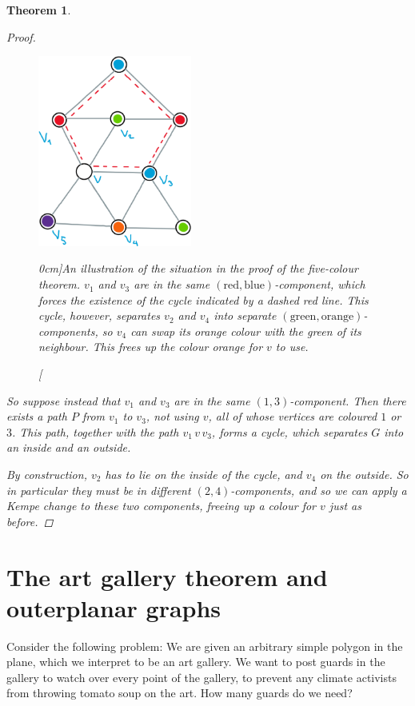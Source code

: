 \documentclass[nobib]{tufte-handout}
\newtheorem{theorem}{Theorem}
\begin{document}
\begin{theorem}
\begin{proof}
    \begin{figure}
      \centering
      \includegraphics[width=0.45\textwidth]{graphics/L12_colouring/planar_five_colour.png}
      \caption[][0cm]{An illustration of the situation in the proof of the five-colour theorem. $v_1$ and $v_3$ are in the same $(\text{red},\text{blue})$-component, which forces the existence of the cycle indicated by a dashed red line. This cycle, however, separates $v_2$ and $v_4$ into separate $(\text{green},\text{orange})$-components, so $v_4$ can swap its orange colour with the green of its neighbour. This frees up the colour orange for $v$ to use.}
      \label{fig:planar_five_colour}
    \end{figure}

    So suppose instead that $v_1$ and $v_3$ are in the same $(1,3)$-component. Then there exists a path $P$ from $v_1$ to $v_3$, not using $v$, all of whose vertices are coloured $1$ or $3$. This path, together with the path $v_1\, v\, v_3$, forms a cycle, which separates $G$ into an inside and an outside.

    By construction, $v_2$ has to lie on the inside of the cycle, and $v_4$ on the outside. So in particular they must be in different $(2,4)$-components, and so we can apply a Kempe change to these two components, freeing up a colour for $v$ just as before.
  \end{proof}
\end{theorem}

\section{The art gallery theorem and outerplanar graphs}

Consider the following problem: We are given an arbitrary simple polygon in the plane, which we interpret to be an art gallery. We want to post guards in the gallery to watch over every point of the gallery, to prevent any climate activists from throwing tomato soup on the art. How many guards do we need?
\end{document}
